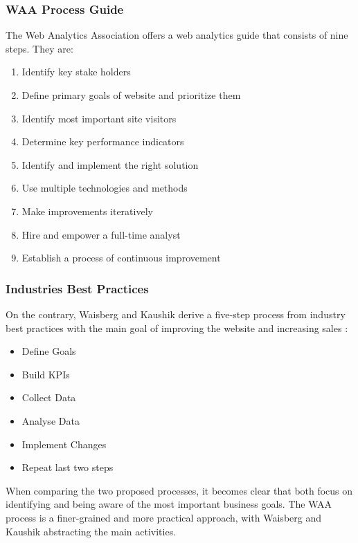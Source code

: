 \subsubsection{WAA Process Guide}


The Web Analytics Association offers a web analytics guide that consists of nine steps. They are: \cite{2009Jansen} %

\begin{enumerate}
\item Identify key stake holders
\item Define primary goals of website and prioritize them
\item Identify most important site visitors
\item Determine key performance indicators
\item Identify and implement the right solution
\item Use multiple technologies and methods
\item Make improvements iteratively
\item Hire and empower a full-time analyst
\item Establish a process of continuous improvement
\end{enumerate}


\subsubsection{Industries Best Practices}

On the contrary, Waisberg and Kaushik derive a five-step process from industry best practices with the main goal of improving the website and increasing sales \cite{2009Waisberg}: %

\begin{itemize}
\item Define Goals
\item Build KPIs
\item Collect Data
\item Analyse Data
\item Implement Changes
\item Repeat last two steps
\end{itemize}



When comparing the two proposed processes, it becomes clear that both focus on identifying and being aware of the most important business goals.
The WAA process is a finer-grained and more practical approach, with Waisberg and Kaushik abstracting the main activities.



